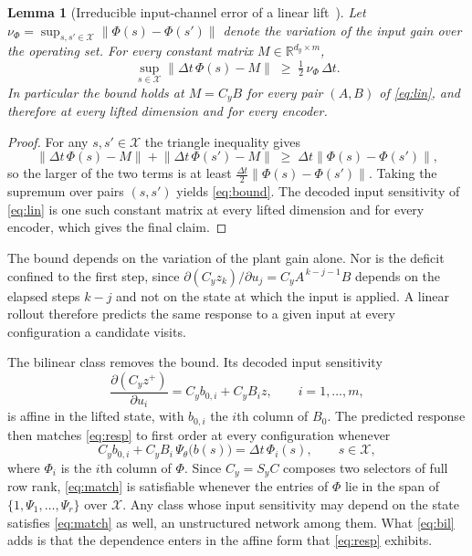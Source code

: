 \documentclass[letterpaper,10pt,conference]{ieeeconf}
\newtheorem{lemma}{Lemma}
\begin{document}
\begin{lemma}[Irreducible input-channel error of a linear lift~\cite{kim2026bilinear}]
\label{lem:linear}
Let $\nu_\Phi = \sup_{s, s' \in \mathcal{X}} \| \Phi(s) - \Phi(s') \|$ denote the variation of the input gain over the operating set.
For every constant matrix $M \in \mathbb{R}^{d_y \times m}$,
\begin{equation}
\sup_{s \in \mathcal{X}} \big\| \Delta t\, \Phi(s) - M \big\|
\;\ge\; \tfrac{1}{2}\, \nu_\Phi\, \Delta t .
\label{eq:bound}
\end{equation}
In particular the bound holds at $M = C_y B$ for every pair $(A, B)$ of \eqref{eq:lin}, and therefore at every lifted dimension and for every encoder.
\end{lemma}

\begin{proof}
For any $s, s' \in \mathcal{X}$ the triangle inequality gives
\begin{equation*}
\big\| \Delta t\, \Phi(s) - M \big\| + \big\| \Delta t\, \Phi(s') - M \big\|
\;\ge\; \Delta t \big\| \Phi(s) - \Phi(s') \big\| ,
\end{equation*}
so the larger of the two terms is at least $\tfrac{\Delta t}{2}\|\Phi(s) - \Phi(s')\|$.
Taking the supremum over pairs $(s, s')$ yields \eqref{eq:bound}.
The decoded input sensitivity of \eqref{eq:lin} is one such constant matrix at every lifted dimension and for every encoder, which gives the final claim.
\end{proof}

The bound depends on the variation of the plant gain alone.
Nor is the deficit confined to the first step, since $\partial (C_y z_k)/\partial u_j = C_y A^{\,k-j-1} B$ depends on the elapsed steps $k-j$ and not on the state at which the input is applied.
A linear rollout therefore predicts the same response to a given input at every configuration a candidate visits.

The bilinear class removes the bound.
Its decoded input sensitivity
\begin{equation}
\frac{\partial (C_y z^{+})}{\partial u_i} = C_y b_{0,i} + C_y B_i z ,
\qquad i = 1, \dots, m,
\label{eq:bilsens}
\end{equation}
is affine in the lifted state, with $b_{0,i}$ the $i$th column of $B_0$.
The predicted response then matches \eqref{eq:resp} to first order at every configuration whenever
\begin{equation}
C_y b_{0,i} + C_y B_i\, \Psi_\theta\big(b(s)\big) = \Delta t\, \Phi_i(s),
\qquad s \in \mathcal{X},
\label{eq:match}
\end{equation}
where $\Phi_i$ is the $i$th column of $\Phi$.
Since $C_y = S_y C$ composes two selectors of full row rank, \eqref{eq:match} is satisfiable whenever the entries of $\Phi$ lie in the span of $\{1, \Psi_1, \dots, \Psi_r\}$ over $\mathcal{X}$.
Any class whose input sensitivity may depend on the state satisfies \eqref{eq:match} as well, an unstructured network among them.
What \eqref{eq:bil} adds is that the dependence enters in the affine form that \eqref{eq:resp} exhibits.
\end{document}
